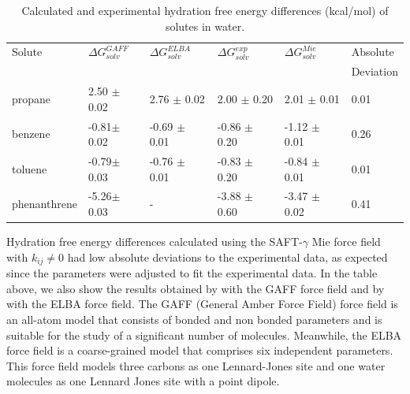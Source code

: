\begin{table}[H]
  \centering
  \caption{Calculated and experimental hydration free energy differences  (kcal/mol) of solutes in water.}
  \label{tbl:solv2}
  \begin{tabular}{llllll}
  	\hline\hline
  	Solute       & $\Delta G_{solv}^{GAFF}$ & $\Delta G_{solv}^{ELBA}$ & $\Delta G_{solv}^{exp}$ & $\Delta G_{solv}^{Mie}$ & Absolute  \\
  	             &                          &                          &                         &                         & Deviation \\ \hline
  	propane      & 2.50 $\pm$0.02           & 2.76 $\pm$ 0.02          & 2.00 $\pm$ 0.20         & 2.01 $\pm$ 0.01         & 0.01      \\
  	benzene      & -0.81$\pm$0.02           & -0.69 $\pm$ 0.01         & -0.86 $\pm$ 0.20        & -1.12 $\pm$ 0.01        & 0.26      \\
  	toluene      & -0.79$\pm$0.03           & -0.76 $\pm$ 0.01         & -0.83 $\pm$ 0.20        & -0.84 $\pm$ 0.01        & 0.01      \\
  	phenanthrene & -5.26$\pm$0.03           & -                        & -3.88 $\pm$ 0.60        & -3.47 $\pm$ 0.02        & 0.41      \\ \hline\hline
  \end{tabular}

\end{table}

Hydration free energy differences calculated using the SAFT-$\gamma$ Mie force field with $k_{ij} \neq 0$ had low absolute deviations to the experimental data, as expected since the parameters were adjusted to fit the experimental data. In the table above, we also show the results obtained by  with the GAFF force field and by  with the ELBA force field. The GAFF (General Amber Force Field) force field is an all-atom model that consists of bonded and non bonded parameters and is suitable for the study of a significant number of molecules. Meanwhile, the ELBA force field is a coarse-grained model that comprises six independent parameters. This force field models three carbons as one Lennard-Jones site and one water molecules as one Lennard Jones site with a point dipole. 

